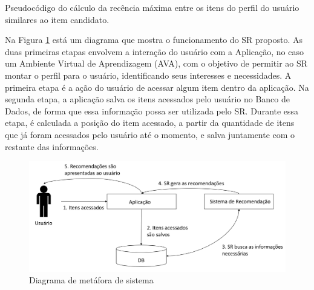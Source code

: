 \begin{algorithm}
  \caption{Pseudocódigo do cálculo da recência máxima entre os itens do perfil do usuário similares ao item candidato. \label{alg:max-recencia-pseudocodigo}}


\end{algorithm}

Na Figura \ref{fig:modelo-proposta} está um diagrama que mostra o funcionamento do SR proposto. As duas primeiras etapas envolvem
a interação do usuário com a Aplicação, no caso um Ambiente Virtual de Aprendizagem (AVA), com o objetivo de permitir ao
SR montar o perfil para o usuário, identificando seus interesses e necessidades. A primeira etapa é a ação do usuário de
acessar algum item dentro da aplicação. Na segunda etapa, a aplicação salva os itens acessados pelo usuário no
Banco de Dados, de forma que essa informação possa ser utilizada pelo SR. Durante essa etapa, é calculada a posição do
item acessado, a partir da quantidade de itens que já foram acessados pelo usuário até o momento, e salva juntamente
com o restante das informações.

\begin{figure}[htb]
  \caption{\label{fig:modelo-proposta}Diagrama de metáfora de sistema}
  \begin{center}
      \includegraphics[scale=0.4]{./Figuras/modelo-proposta.png}
  \end{center}
\end{figure}

